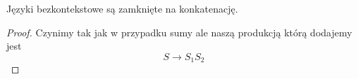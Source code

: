 \begin{theorem}
	Języki bezkontekstowe są zamknięte na konkatenację.
\end{theorem}
\begin{proof}
	Czynimy tak jak w przypadku sumy ale naszą produkcją którą dodajemy jest
	\[
		S \rightarrow S_1S_2
	\]
\end{proof}